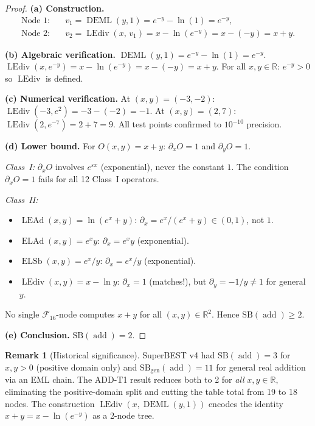 \documentclass[12pt,a4paper]{article}
\theoremstyle{definition}
\newtheorem{remark}[theorem]{Remark}
\newcommand{\DEML}{\operatorname{DEML}}
\newcommand{\ELAd}{\operatorname{ELAd}}
\newcommand{\ELSb}{\operatorname{ELSb}}
\newcommand{\LEAd}{\operatorname{LEAd}}
\newcommand{\LEdiv}{\operatorname{LEdiv}}
\newcommand{\addop}{\operatorname{add}}
\newcommand{\SB}{\mathrm{SB}}
\newcommand{\F}{\mathcal{F}_{16}}
\newcommand{\R}{\mathbb{R}}
\begin{document}
\begin{proof}
\textbf{(a) Construction.}
\begin{align*}
  \text{Node 1:} &\quad v_1 = \DEML(y,1) = e^{-y} - \ln(1) = e^{-y}, \\
  \text{Node 2:} &\quad v_2 = \LEdiv(x,\,v_1)
    = x - \ln(e^{-y}) = x - (-y) = x + y.
\end{align*}

\textbf{(b) Algebraic verification.}
$\DEML(y,1) = e^{-y} - \ln(1) = e^{-y}$.
$\LEdiv(x, e^{-y}) = x - \ln(e^{-y}) = x - (-y) = x + y$.
For all $x, y \in \R$: $e^{-y} > 0$ so $\LEdiv$ is defined.

\textbf{(c) Numerical verification.}
At $(x,y) = (-3,-2)$: $\LEdiv(-3, e^{2}) = -3 - (-2) = -1$.\;
At $(x,y) = (2,7)$: $\LEdiv(2, e^{-7}) = 2 + 7 = 9$.\;
All test points confirmed to $10^{-10}$ precision.

\textbf{(d) Lower bound.}
For $O(x,y) = x+y$: $\partial_x O = 1$ and $\partial_y O = 1$.

\emph{Class~I:} $\partial_x O$ involves $e^{\varepsilon x}$ (exponential), never the
constant $1$.  The condition $\partial_x O = 1$ fails for all 12 Class~I operators.

\emph{Class~II:}
\begin{itemize}
  \item $\LEAd(x,y) = \ln(e^x+y)$: $\partial_x = e^x/(e^x+y) \in (0,1)$, not $1$.
  \item $\ELAd(x,y) = e^x y$: $\partial_x = e^x y$ (exponential).
  \item $\ELSb(x,y) = e^x/y$: $\partial_x = e^x/y$ (exponential).
  \item $\LEdiv(x,y) = x - \ln y$: $\partial_x = 1$ (matches!),
    but $\partial_y = -1/y \ne 1$ for general $y$.
\end{itemize}
No single $\F$-node computes $x+y$ for all $(x,y) \in \R^2$.
Hence $\SB(\addop) \ge 2$.

\textbf{(e) Conclusion.} $\SB(\addop) = 2$.
\end{proof}

\begin{remark}[Historical significance]
SuperBEST v4 had $\SB(\addop) = 3$ for $x, y > 0$ (positive domain only) and
$\SB_{\mathrm{gen}}(\addop) = 11$ for general real addition via an EML chain.
The ADD-T1 result reduces both to 2 for \emph{all} $x, y \in \R$,
eliminating the positive-domain split and cutting the table total from 19 to 18 nodes.
The construction $\LEdiv(x, \DEML(y, 1))$ encodes the identity
$x + y = x - \ln(e^{-y})$ as a 2-node tree.
\end{remark}
\end{document}
